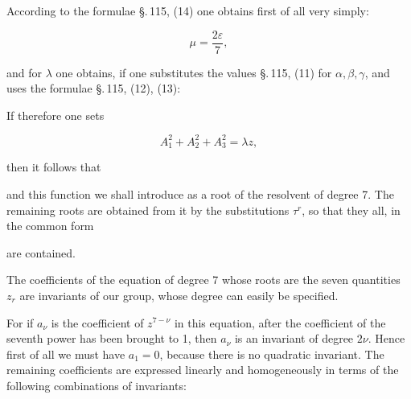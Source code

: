 
According to the formulae \S.\,115, (14) one obtains first of all very simply:

\[
\mu = \frac{2\varepsilon}{7},
\]

and for $\lambda$ one obtains, if one substitutes the values \S.\,115, (11) for $\alpha, \beta, \gamma$, and uses the formulae \S.\,115, (12), (13):


If therefore one sets

\[
A_1^2+A_2^2+A_3^2 = \lambda z,
\]

then it follows that


and this function we shall introduce as a root of the resolvent of degree 7. The remaining roots are obtained from it by the substitutions $\tau^r$, so that they all, in the common form


are contained.

The coefficients of the equation of degree 7 whose roots are the seven quantities $z_r$ are invariants of our group, whose degree can easily be specified.

For if $a_\nu$ is the coefficient of $z^{7-\nu}$ in this equation, after the coefficient of the seventh power has been brought to 1, then $a_\nu$ is an invariant of degree $2\nu$. Hence first of all we must have $a_1=0$, because there is no quadratic invariant. The remaining coefficients are expressed linearly and homogeneously in terms of the following combinations of invariants:

